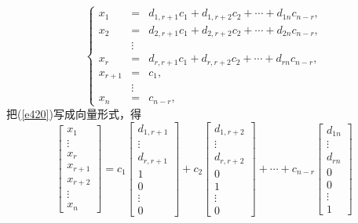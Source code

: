 \documentclass[compress,mathserif,cjk]{beamer}
\theoremstyle{remark}
\numberwithin{equation}{section}
\begin{document}
\begin{CJK}{UTF8}{gbsn}
\begin{frame}\small
 \begin{equation}\label{e420}
 \left\{\begin{array}{rcl}
 x_1&=&d_{1,r+1}c_1+d_{1,r+2}c_2+\cdots+d_{1n}c_{n-r},\\
 x_2&=&d_{2,r+1}c_1+d_{2,r+2}c_2+\cdots+d_{2n}c_{n-r},\\
 &\vdots& \\
 x_r&=&d_{r,r+1}c_1+d_{r,r+2}c_2+\cdots+d_{rn}c_{n-r},\\
 x_{r+1}&=&c_1, \\
 &\vdots& \\
 x_n&=&c_{n-r},
 \end{array}\right.
 \end{equation}
 把(\ref{e420})写成向量形式，得
 \begin{equation}\label{e421}
 \left[\begin{matrix}x_1\\\vdots\\x_r\\x_{r+1}\\x_{r+2}\\\vdots\\x_n\end{matrix}\right]=c_1\left[\begin{matrix}d_{1,r+1}\\\vdots\\d_{r,r+1}\\1\\0\\\vdots\\0\end{matrix}\right]
 +c_2\left[\begin{matrix}d_{1,r+2}\\\vdots\\d_{r,r+2}\\0\\1\\\vdots\\0\end{matrix}\right]+\cdots+c_{n-r}\left[\begin{matrix}d_{1n}\\\vdots\\d_{rn}\\0\\0\\\vdots\\1\end{matrix}\right]
 \end{equation}
\end{frame}


\end{CJK}
\end{document}
